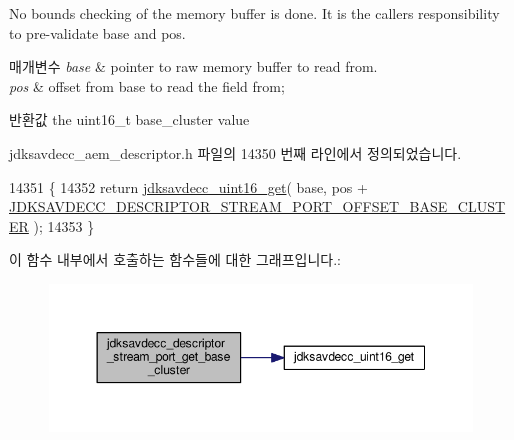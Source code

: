 No bounds checking of the memory buffer is done. It is the caller\textquotesingle{}s responsibility to pre-\/validate base and pos.


\begin{DoxyParams}{매개변수}
{\em base} & pointer to raw memory buffer to read from. \\
\hline
{\em pos} & offset from base to read the field from; \\
\hline
\end{DoxyParams}
\begin{DoxyReturn}{반환값}
the uint16\+\_\+t base\+\_\+cluster value 
\end{DoxyReturn}


jdksavdecc\+\_\+aem\+\_\+descriptor.\+h 파일의 14350 번째 라인에서 정의되었습니다.


\begin{DoxyCode}
14351 \{
14352     \textcolor{keywordflow}{return} \hyperlink{group__endian_ga3fbbbc20be954aa61e039872965b0dc9}{jdksavdecc\_uint16\_get}( base, pos + 
      \hyperlink{group__descriptor__stream__port_gab0727e3e5c98cc2806c8a22bace4e62a}{JDKSAVDECC\_DESCRIPTOR\_STREAM\_PORT\_OFFSET\_BASE\_CLUSTER} 
      );
14353 \}
\end{DoxyCode}


이 함수 내부에서 호출하는 함수들에 대한 그래프입니다.\+:
\nopagebreak
\begin{figure}[H]
\begin{center}
\leavevmode
\includegraphics[width=350pt]{group__descriptor__stream__port_ga94d4d5b718a920fa018d2b0070fe5208_cgraph}
\end{center}
\end{figure}




